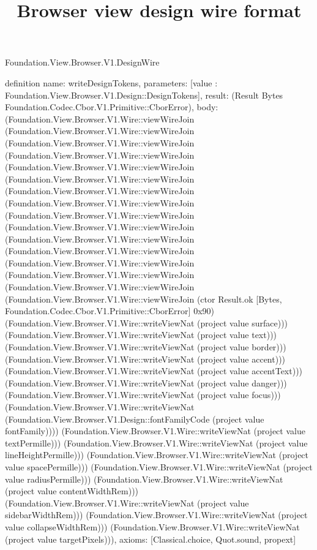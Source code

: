 \begin{lexlean}{Foundation.View.Browser.V1.DesignWire}
\title{Browser view design wire format}
\begin{semanticmodule}
definition{
  name: writeDesignTokens,
  parameters: [value : Foundation.View.Browser.V1.Design::DesignTokens],
  result: (Result Bytes Foundation.Codec.Cbor.V1.Primitive::CborError),
  body: (Foundation.View.Browser.V1.Wire::viewWireJoin (Foundation.View.Browser.V1.Wire::viewWireJoin (Foundation.View.Browser.V1.Wire::viewWireJoin (Foundation.View.Browser.V1.Wire::viewWireJoin (Foundation.View.Browser.V1.Wire::viewWireJoin (Foundation.View.Browser.V1.Wire::viewWireJoin (Foundation.View.Browser.V1.Wire::viewWireJoin (Foundation.View.Browser.V1.Wire::viewWireJoin (Foundation.View.Browser.V1.Wire::viewWireJoin (Foundation.View.Browser.V1.Wire::viewWireJoin (Foundation.View.Browser.V1.Wire::viewWireJoin (Foundation.View.Browser.V1.Wire::viewWireJoin (Foundation.View.Browser.V1.Wire::viewWireJoin (Foundation.View.Browser.V1.Wire::viewWireJoin (Foundation.View.Browser.V1.Wire::viewWireJoin (Foundation.View.Browser.V1.Wire::viewWireJoin (ctor Result.ok [Bytes, Foundation.Codec.Cbor.V1.Primitive::CborError] 0x90) (Foundation.View.Browser.V1.Wire::writeViewNat (project value surface))) (Foundation.View.Browser.V1.Wire::writeViewNat (project value text))) (Foundation.View.Browser.V1.Wire::writeViewNat (project value border))) (Foundation.View.Browser.V1.Wire::writeViewNat (project value accent))) (Foundation.View.Browser.V1.Wire::writeViewNat (project value accentText))) (Foundation.View.Browser.V1.Wire::writeViewNat (project value danger))) (Foundation.View.Browser.V1.Wire::writeViewNat (project value focus))) (Foundation.View.Browser.V1.Wire::writeViewNat (Foundation.View.Browser.V1.Design::fontFamilyCode (project value fontFamily)))) (Foundation.View.Browser.V1.Wire::writeViewNat (project value textPermille))) (Foundation.View.Browser.V1.Wire::writeViewNat (project value lineHeightPermille))) (Foundation.View.Browser.V1.Wire::writeViewNat (project value spacePermille))) (Foundation.View.Browser.V1.Wire::writeViewNat (project value radiusPermille))) (Foundation.View.Browser.V1.Wire::writeViewNat (project value contentWidthRem))) (Foundation.View.Browser.V1.Wire::writeViewNat (project value sidebarWidthRem))) (Foundation.View.Browser.V1.Wire::writeViewNat (project value collapseWidthRem))) (Foundation.View.Browser.V1.Wire::writeViewNat (project value targetPixels))),
  axioms: [Classical.choice, Quot.sound, propext]
}


\end{semanticmodule}
\end{lexlean}
